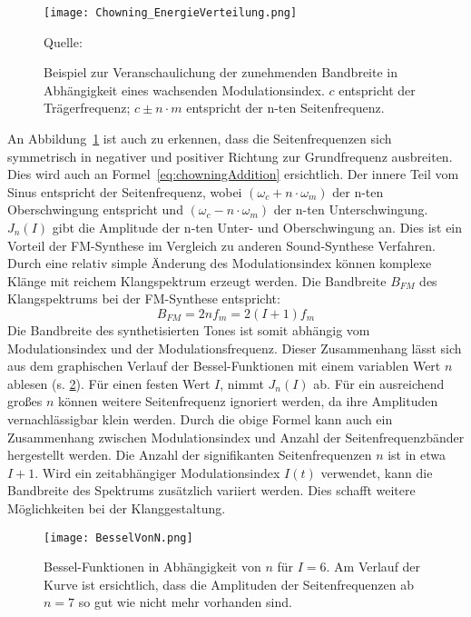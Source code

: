 \begin{figure} [ht]
\centering
  \texttt{[image: Chowning\_EnergieVerteilung.png]}
\caption{Beispiel zur Veranschaulichung der zunehmenden Bandbreite in Abhängigkeit eines wachsenden Modulationsindex. $c$ entspricht der Trägerfrequenz; $c\pm n\cdot m$ entspricht der n-ten Seitenfrequenz.}
\label{fig:chowningEnergieVerteilung}
Quelle: \cite{chowningPaper}
\end{figure}
\FloatBarrier

An Abbildung~\ref{fig:chowningEnergieVerteilung} ist auch zu erkennen, dass die Seitenfrequenzen sich symmetrisch in negativer und positiver Richtung zur Grundfrequenz ausbreiten.
Dies wird auch an Formel~\ref{eq:chowningAddition} ersichtlich. Der innere Teil vom Sinus entspricht der Seitenfrequenz, wobei $(\omega_c+n\cdot \omega_m)$ der n-ten Oberschwingung entspricht und $(\omega_c-n\cdot \omega_m)$ der n-ten Unterschwingung. $J_n(I)$ gibt die Amplitude der n-ten Unter- und Oberschwingung an. 
Dies ist ein Vorteil der FM-Synthese im Vergleich zu anderen Sound-Synthese Verfahren. Durch eine relativ simple Änderung des Modulationsindex können komplexe Klänge mit reichem Klangspektrum erzeugt werden. Die Bandbreite $B_{FM}$ des Klangspektrums bei der FM-Synthese entspricht: \cite[S. 221]{lathi}
\begin{equation}
B_{FM}=2nf_m=2(I+1)f_m
\label{eq:fmBandwidth}
\end{equation} 
Die Bandbreite des synthetisierten Tones ist somit abhängig vom Modulationsindex und der Modulationsfrequenz. 
Dieser Zusammenhang lässt sich aus dem graphischen Verlauf der Bessel-Funktionen mit einem variablen Wert $n$ ablesen (s. \ref{fig:besselVonN}). Für einen festen Wert $I$, nimmt $J_n(I)$ ab. Für ein ausreichend großes $n$ können weitere Seitenfrequenz ignoriert werden, da ihre Amplituden vernachlässigbar klein werden. 
Durch die obige Formel kann auch ein Zusammenhang zwischen Modulationsindex und Anzahl der Seitenfrequenzbänder hergestellt werden. Die Anzahl der signifikanten Seitenfrequenzen $n$ ist in etwa $I+1$. Wird ein zeitabhängiger Modulationsindex $I(t)$ verwendet, kann die Bandbreite des Spektrums zusätzlich variiert werden. Dies schafft weitere Möglichkeiten bei der Klanggestaltung. 

\begin{figure} [ht]
\centering
  \texttt{[image: BesselVonN.png]}
\caption{Bessel-Funktionen in Abhängigkeit von $n$ für $I=6$. Am Verlauf der Kurve ist ersichtlich, dass die Amplituden der Seitenfrequenzen ab $n=7$ so gut wie nicht mehr vorhanden sind.}
\label{fig:besselVonN}
\end{figure}
\FloatBarrier


